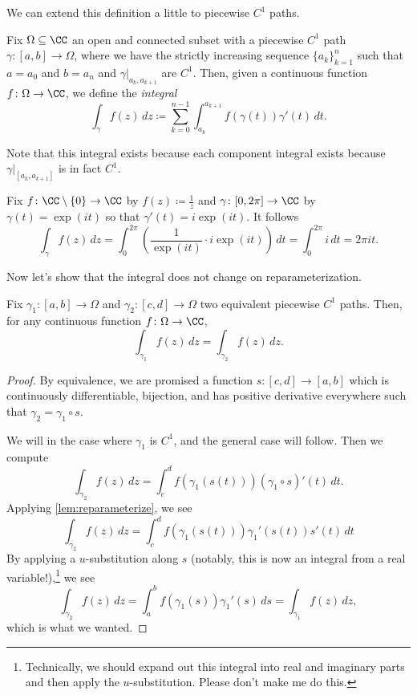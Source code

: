 We can extend this definition a little to piecewise $C^1$ paths.
\begin{definition}[Integration]
	Fix $\Omega\subseteq\CC$ an open and connected subset with a piecewise $C^1$ path $\gamma\colon [a,b]\to\Omega$, where we have the strictly increasing sequence $\{a_k\}_{k=1}^n$ such that $a=a_0$ and $b=a_n$ and $\gamma|_{a_k,a_{k+1}}$ are $C^1$. Then, given a continuous function $f\colon \Omega\to\CC$, we define the \textit{integral}
	\[\int_\gamma f(z)\,dz\coloneqq \sum_{k=0}^{n-1}\int_{a_k}^{a_{k+1}}f(\gamma(t))\gamma'(t)\,dt.\]
\end{definition}
Note that this integral exists because each component integral exists because $\gamma|_{[a_k,a_{k+1}]}$ is in fact $C^1$.
\begin{example} \label{ex:windaround0}
	Fix $f\colon \CC\setminus\{0\}\to\CC$ by $f(z)\coloneqq \frac1z$ and $\gamma\colon [0,2\pi]\to\CC$ by $\gamma(t)=\exp(it)$ so that $\gamma'(t)=i\exp(it)$. It follows
	\[\int_\gamma f(z)\,dz=\int_0^{2\pi}\left(\frac1{\exp(it)}\cdot i\exp(it)\right)\,dt=\int_0^{2\pi}i\,dt=2\pi it.\]
\end{example}
Now let's show that the integral does not change on reparameterization.
\begin{lemma} \label{lem:reparam}
	Fix $\gamma_1\colon [a,b]\to\Omega$ and $\gamma_2\colon [c,d]\to\Omega$ two equivalent piecewise $C^1$ paths. Then, for any continuous function $f\colon \Omega\to\CC$,
	\[\int_{\gamma_1}f(z)\,dz=\int_{\gamma_2}f(z)\,dz.\]
\end{lemma}
\begin{proof}
	By equivalence, we are promised a function $s\colon [c,d]\to[a,b]$ which is continuously differentiable, bijection, and has positive derivative everywhere such that $\gamma_2=\gamma_1\circ s$.

	We will in the case where $\gamma_1$ is $C^1$, and the general case will follow. Then we compute
	\[\int_{\gamma_2}f(z)\,dz=\int_c^df(\gamma_1(s(t)))(\gamma_1\circ s)'(t)\,dt.\]
	Applying \autoref{lem:reparameterize}, we see
	\[\int_{\gamma_2}f(z)\,dz=\int_c^df(\gamma_1(s(t)))\gamma_1'(s(t))s'(t)\,dt\]
	By applying a $u$-substitution along $s$ (notably, this is now an integral from a real variable!),\footnote{Technically, we should expand out this integral into real and imaginary parts and then apply the $u$-substitution. Please don't make me do this.} we see
	\[\int_{\gamma_2}f(z)\,dz=\int_a^bf(\gamma_1(s))\gamma_1'(s)\,ds=\int_{\gamma_1}f(z)\,dz,\]
	which is what we wanted.
\end{proof}

